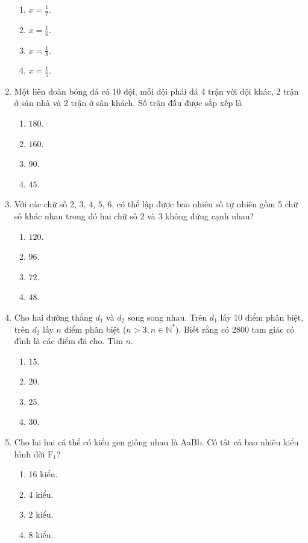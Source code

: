\begin{enumerate}[label=\textbf{Câu \arabic*.},align=left,left=0cm..0cm,itemindent=*]
	\begin{enumerate}[label=\textbf{\Alph*.},align=left,left=1cm..0cm,itemindent=*]
		\item $x=\frac 17$. \item $x=\frac 16$. \item $x=\frac 18$. \item $x=\frac 15$.
	\end{enumerate}
	\item Một liên đoàn bóng đá có 10 đội, mỗi đội phải đá 4 trận với đội khác, 2 trận ở sân nhà và 2 trận ở sân khách. Số trận đấu được sắp xếp là
	\begin{enumerate}[label=\textbf{\Alph*.},align=left,left=1cm..0cm,itemindent=*]
		\item $180$. \item $160$. \item $90$. \item $45$.
	\end{enumerate}
	\item Với các chữ số $2$, $3$, $4$, $5$, $6$, có thể lập được bao nhiêu số tự nhiên gồm 5 chữ số khác nhau trong đó hai chữ số $2$ và $3$ không đứng cạnh nhau?
	\begin{enumerate}[label=\textbf{\Alph*.},align=left,left=1cm..0cm,itemindent=*]
		\item $120$. \item $96$. \item $72$. \item $48$.
	\end{enumerate}
	\item Cho hai đường thẳng $d_1$ và $d_2$ song song nhau. Trên $d_1$ lấy 10 điểm phân biệt, trên $d_2$ lấy $n$ điểm phân biệt ($n>3,n\in\mathbb{N}^{*}$). Biết rằng có 2800 tam giác có đỉnh là các điểm đã cho. Tìm $n$.
	\begin{enumerate}[label=\textbf{\Alph*.},align=left,left=1cm..0cm,itemindent=*]
		\item $15$. \item $20$. \item $25$. \item $30$.
	\end{enumerate}
	\item Cho lai hai cá thể có kiểu gen giống nhau là AaBb. Có tất cả bao nhiêu kiểu hình đời $\text{F}_1$?
	\begin{enumerate}[label=\textbf{\Alph*.},align=left,left=1cm..0cm,itemindent=*]
		\item 16 kiểu. \item 4 kiểu. \item 2 kiểu. \item 8 kiểu.

\end{enumerate}
\end{enumerate}
